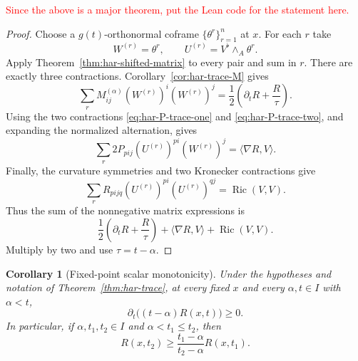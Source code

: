 \documentclass[10pt]{coll-l}
\newtheorem{corollary}[theorem]{Corollary}
\theoremstyle{definition}
\theoremstyle{remark}
\numberwithin{section}{chapter}
\numberwithin{equation}{chapter}
\newcommand{\Ric}{\operatorname{Ric}}
\begin{document}
\textcolor{red}{Since the above is a major theorem, put the Lean code for the statement here.}

\begin{proof}
Choose a $g(t)$-orthonormal coframe $\{\theta^r\}_{r=1}^n$ at $x$.  For each
$r$ take
\begin{equation}
 W^{(r)}=\theta^r,\qquad
 U^{(r)}=V^\flat\mathbin{\wedge_{\!A}}\theta^r.          \label{eq:har-trace-test-pairs}
\end{equation}
Apply Theorem~\ref{thm:har-shifted-matrix} to every pair and sum in $r$.
There are exactly three contractions.  Corollary~\ref{cor:har-trace-M}
gives
\begin{equation}
 \sum_rM^{(\alpha)}_{ij}(W^{(r)})^i(W^{(r)})^j
    =\frac12\left(\partial_tR+\frac R\tau\right).        \label{eq:har-trace-contraction-M}
\end{equation}
Using the two contractions \eqref{eq:har-P-trace-one} and
\eqref{eq:har-P-trace-two}, and expanding the normalized alternation, gives
\begin{equation}
 \sum_r2P_{pij}(U^{(r)})^{pi}(W^{(r)})^j
       =\langle\nabla R,V\rangle.                       \label{eq:har-trace-contraction-P}
\end{equation}
Finally, the curvature symmetries and two Kronecker contractions give
\begin{equation}
 \sum_rR_{pijq}(U^{(r)})^{pi}(U^{(r)})^{qj}
       =\Ric(V,V).                                      \label{eq:har-trace-contraction-Rm}
\end{equation}
Thus the sum of the nonnegative matrix expressions is
\[
 \frac12\left(\partial_tR+\frac R\tau\right)
      +\langle\nabla R,V\rangle+\Ric(V,V).
\]
Multiply by two and use $\tau=t-\alpha$.
\end{proof}

\begin{corollary}[Fixed-point scalar monotonicity]
\label{cor:har-tR-monotone}
Under the hypotheses and notation of Theorem~\ref{thm:har-trace}, at every
fixed $x$ and every $\alpha,t\in I$ with $\alpha<t$,
\begin{equation}
       \partial_t\bigl((t-\alpha)R(x,t)\bigr)\geq0.     \label{eq:har-tR-monotone}
\end{equation}
In particular, if $\alpha,t_1,t_2\in I$ and $\alpha<t_1\leq t_2$, then
\begin{equation}
 R(x,t_2)\geq\frac{t_1-\alpha}{t_2-\alpha}R(x,t_1).     \label{eq:har-fixed-point-comparison}
\end{equation}
\end{corollary}
\end{document}
